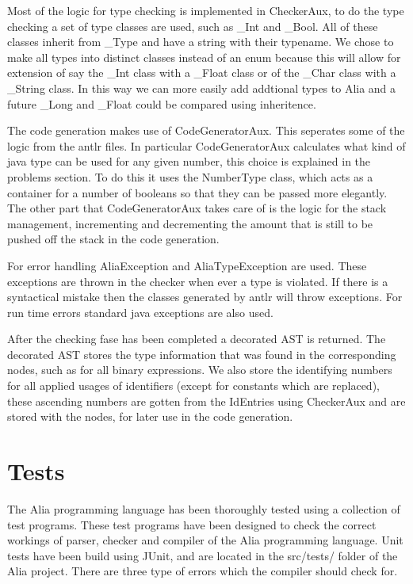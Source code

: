 \documentclass[paper=a4, fontsize=11pt]{article}
\numberwithin{equation}{section}		%
\numberwithin{figure}{section}			%
\numberwithin{table}{section}				%
\begin{document}
Most of the logic for type checking is implemented in CheckerAux, to do the type checking a set of type classes are used, such as \_Int and \_Bool. All of these classes inherit from \_Type and have a string with their typename. We chose to make all types into distinct classes instead of an enum because this will allow for extension of say the \_Int class with a \_Float class or of the \_Char class with a \_String class. In this way we can more easily add addtional types to Alia and a future \_Long and \_Float could be compared using inheritence.

The code generation makes use of CodeGeneratorAux. This seperates some of the logic from the antlr files. In particular CodeGeneratorAux calculates what kind of java type can be used for any given number, this choice is explained in the problems section. To do this it uses the NumberType class, which acts as a container for a number of booleans so that they can be passed more elegantly. The other part that CodeGeneratorAux takes care of is the logic for the stack management, incrementing and decrementing the amount that is still to be pushed off the stack in the code generation.

For error handling AliaException and AliaTypeException are used. These exceptions are thrown in the checker when ever a type is violated. If there is a syntactical mistake then the classes generated by antlr will throw exceptions. For run time errors standard java exceptions are also used.

After the checking fase has been completed a decorated AST is returned. The decorated AST stores the type information that was found in the corresponding nodes, such as for all binary expressions. We also store the identifying numbers for all applied usages of identifiers (except for constants which are replaced), these ascending numbers are gotten from the IdEntries using CheckerAux and are stored with the nodes, for later use in the code generation.

\section{Tests}
The Alia programming language has been thoroughly tested using a collection of test programs. These test programs have been designed to check the correct workings of parser, checker and compiler of the Alia programming language. Unit tests have been build using JUnit, and are located in the src/tests/ folder of the Alia project. There are three type of errors which the compiler should check for.
\end{document}

